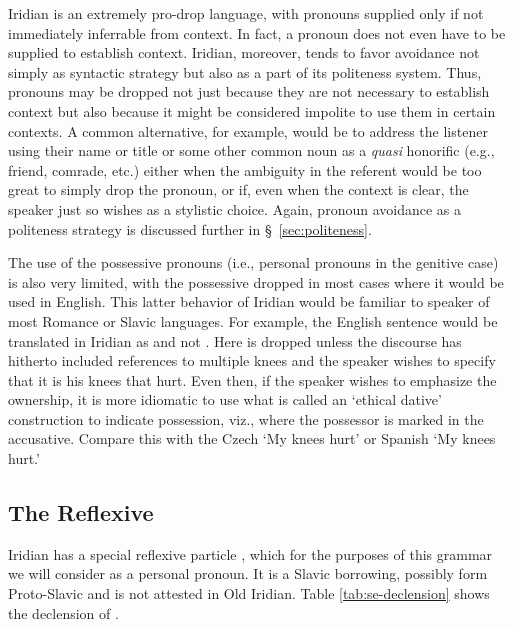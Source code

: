 Iridian is an extremely pro-drop language, with pronouns supplied only if not
immediately inferrable from context. In fact, a pronoun does not even have to be
supplied to establish context. Iridian, moreover, tends to favor avoidance not
simply as syntactic strategy but also as a part of its politeness system. Thus,
pronouns may be dropped not just because they are not necessary to establish
context but also because it might be considered impolite to use them in certain
contexts. A common alternative, for example, would be to address the listener
using their name or title or some other common noun as a \emph{quasi} honorific
(e.g., friend, comrade, etc.) either when the ambiguity in the referent would be
too great to simply drop the pronoun, or if, even when the context is clear, the
speaker just so wishes as a stylistic choice. Again, pronoun avoidance as a
politeness strategy is discussed further in \S~\ref{sec:politeness}.

The use of the possessive pronouns (i.e., personal pronouns in the genitive
case) is also very limited, with the possessive dropped in most cases where it
would be used in English. This latter behavior of Iridian would be familiar to
speaker of most Romance or Slavic languages. For example, the English sentence
 would be translated in Iridian as  and
not . Here  is dropped unless the discourse
has hitherto included references to multiple knees and the speaker wishes to
specify that it is his knees that hurt. Even then, if the speaker wishes to
emphasize the ownership, it is more idiomatic to use what is called an `ethical
dative' construction to indicate possession, viz.,
 where the possessor is marked in the accusative. Compare
this with the Czech  `My knees hurt' or Spanish
 `My knees hurt.'

\subsection{The Reflexive }\label{sec:reflexive-se}

Iridian has a special reflexive particle , which for the purposes of
this grammar we will consider as a personal pronoun. It is a Slavic borrowing,
possibly form Proto-Slavic  and is not attested in Old Iridian.
Table \ref{tab:se-declension} shows the declension of .

